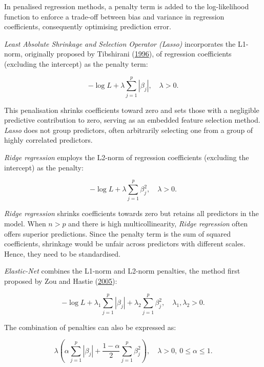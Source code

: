 \documentclass[
  11pt,
]{article}
\begin{document}
In penalised regression methods, a penalty term is added to the
log-likelihood function to enforce a trade-off between bias and variance
in regression coefficients, consequently optimising prediction error.

\emph{Least Absolute Shrinkage and Selection Operator (Lasso)}
incorporates the L1-norm, originally proposed by Tibshirani
(\protect\hyperlink{ref-Tibshirani1996}{1996}), of regression
coefficients (excluding the intercept) as the penalty term:

\begin{equation}
- \log L + \lambda \sum_{j=1}^{p} |\beta_j|, \quad \lambda > 0.
\end{equation}

This penalisation shrinks coefficients toward zero and sets those with a
negligible predictive contribution to zero, serving as an embedded
feature selection method. \emph{Lasso} does not group predictors, often
arbitrarily selecting one from a group of highly correlated predictors.

\emph{Ridge regression} employs the L2-norm of regression coefficients
(excluding the intercept) as the penalty:

\begin{equation}
- \log L + \lambda \sum_{j=1}^{p} \beta_j^2, \quad \lambda > 0.
\end{equation}

\emph{Ridge regression} shrinks coefficients towards zero but retains
all predictors in the model. When \(n > p\) and there is high
multicollinearity, \emph{Ridge regression} often offers superior
predictions. Since the penalty term is the sum of squared coefficients,
shrinkage would be unfair across predictors with different scales.
Hence, they need to be standardised.

\emph{Elastic-Net} combines the L1-norm and L2-norm penalties, the
method first proposed by Zou and Hastie
(\protect\hyperlink{ref-Zou2005}{2005}):

\begin{equation}
- \log L + \lambda_1 \sum_{j=1}^{p} |\beta_j| + \lambda_2 \sum_{j=1}^{p} \beta_j^2, \quad \lambda_1, \lambda_2 > 0.
\end{equation}

The combination of penalties can also be expressed as:

\begin{equation}
\lambda \left( \alpha \sum_{j=1}^{p} |\beta_j| + \frac{1-\alpha}{2} \sum_{j=1}^{p} \beta_j^2 \right), \quad \lambda > 0, \ 0 \leq \alpha \leq 1.
\end{equation}
\end{document}
